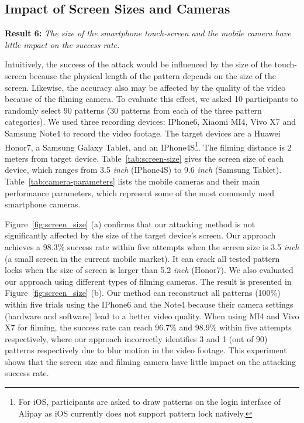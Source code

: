     \subsection{Impact of Screen Sizes and Cameras}
    \label{section: screen-size and cameras}
    \noindent \textbf{Result 6:} \emph{The size of the smartphone touch-screen and the mobile camera have little impact on the success rate.}

    Intuitively, the success of the attack would be influenced by the size of
    the touch-screen because the physical length of the pattern depends on
    the size of the screen. Likewise, the accuracy also may be affected by
    the quality of the video because of the filming camera. To evaluate this
    effect, we asked 10 participants to randomly select 90 patterns (30
    patterns from each of the three pattern categories). We used three
    recording devices: IPhone6, Xiaomi MI4, Vivo X7 and Samsung Note4 to
    record the video footage. The target devices are a Huawei Honor7, a
    Samsung Galaxy Tablet, and an IPhone4S\footnote{For iOS, participants are asked
    to draw  patterns on the login interface of Alipay as iOS
    currently does not support pattern lock natively.}. The filming distance is 2
    meters from target device. Table~\ref{tab:screen-size} gives the screen
    size of each device, which ranges from 3.5 \emph{inch} (IPhone4S) to
    9.6 \emph{inch} (Samsung Tablet). Table~\ref{tab:camera-parameters} lists
    the mobile cameras and their main performance parameters, which
    represent some of the most commonly used smartphone cameras.

    Figure~\ref{fig:screen_size} (a) confirms that our attacking method
    is not significantly affected by the size of the
     target device's screen. Our approach achieves a 98.3\%  success rate within five
    attempts when the screen size is 3.5 \emph{inch} (a small screen in the current
     mobile market). It can crack all tested pattern locks when
    the size of screen is larger than 5.2 \emph{inch} (Honor7). We also
    evaluated  our approach using different types of filming cameras.
    The result is presented in Figure~\ref{fig:screen_size}
    (b). Our method can reconstruct all patterns (100\%) within five trials using
    the IPhone6 and the Note4 because their camera settings (hardware and software) lead to a better video
    quality.   When using MI4 and Vivo X7 for filming,
     the success rate can reach 96.7\% and 98.9\% within five
    attempts respectively, where our approach incorrectly identifies 3 and 1 (out of
    90) patterns respectively due to blur motion in the video footage.
    This experiment shows that the screen size and filming camera
    have little impact on the attacking success rate.


